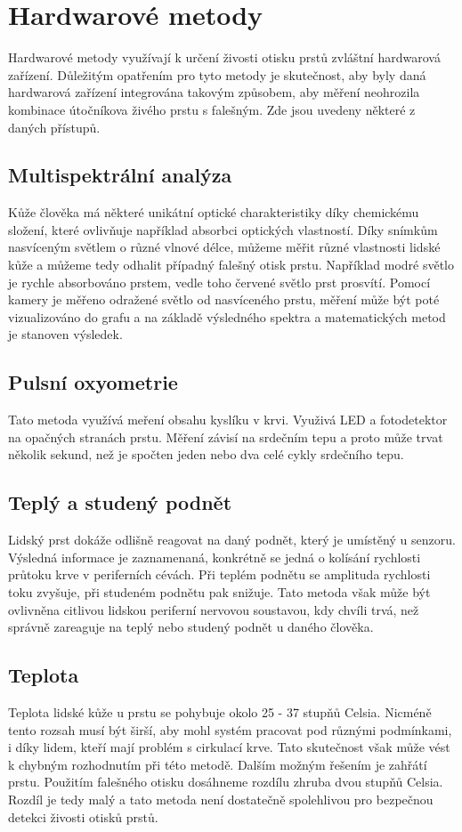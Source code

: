 \section{Hardwarové metody}
Hardwarové metody využívají k určení živosti otisku prstů zvláštní hardwarová zařízení. Důležitým opatřením pro tyto metody je skutečnost, aby byly daná hardwarová zařízení integrována takovým způsobem, aby měření neohrozila kombinace útočníkova živého prstu s falešným. Zde jsou uvedeny některé z daných přístupů.
\subsection{Multispektrální analýza}
Kůže člověka má některé unikátní optické charakteristiky díky chemickému složení, které ovlivňuje například absorbci optických vlastností. Díky snímkům nasvíceným světlem o různé vlnové délce, můžeme měřit různé vlastnosti lidské kůže a můžeme tedy odhalit případný falešný otisk prstu. Například modré světlo je rychle absorbováno prstem, vedle toho červené světlo prst prosvítí. Pomocí kamery je měřeno odražené světlo od nasvíceného prstu, měření může být poté vizualizováno do grafu a na základě výsledného spektra a matematických metod je stanoven výsledek.\cite{AdvancedBiometricsTechnologies2011}
\subsection{Pulsní oxyometrie}
Tato metoda využívá meření obsahu kyslíku v krvi. Využivá LED a fotodetektor na opačných stranách prstu. Měření závisí na srdečním tepu a proto může trvat několik sekund, než je spočten jeden nebo dva celé cykly srdečního tepu.\cite{BiometricsEncyclopedia2009}
\subsection{Teplý a studený podnět}
Lidský prst dokáže odlišně reagovat na daný podnět, který je umístěný u senzoru. Výsledná informace je zaznamenaná, konkrétně se jedná o kolísání rychlosti průtoku krve v periferních cévách. Při teplém podnětu se amplituda rychlosti toku zvyšuje, při studeném podnětu pak snižuje. Tato metoda však může být ovlivněna citlivou lidskou periferní nervovou soustavou, kdy chvíli trvá, než správně zareaguje na teplý nebo studený podnět u daného člověka.\cite{AdvancedBiometricsTechnologies2011}
\subsection{Teplota}
Teplota lidské kůže u prstu se pohybuje okolo 25 - 37 stupňů Celsia. Nicméně tento rozsah musí být širší, aby mohl systém pracovat pod různými podmínkami, i díky lidem, kteří mají problém s cirkulací krve. Tato skutečnost však může vést k chybným rozhodnutím při této metodě. Dalším možným řešením je zahřátí prstu. Použitím falešného otisku dosáhneme rozdílu zhruba dvou stupňů Celsia. Rozdíl je tedy malý a tato metoda není dostatečně spolehlivou pro bezpečnou detekci živosti otisků prstů.\cite{AdvancedBiometricsTechnologies2011}

